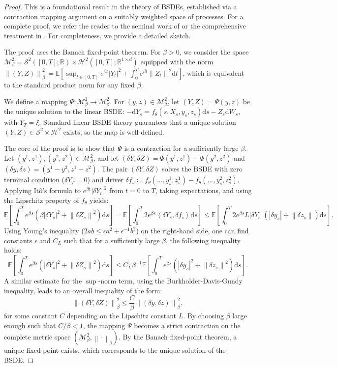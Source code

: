 \documentclass[qian]{imsart}
\newcommand{\R}{\mathbb{R}}
\newcommand{\E}{\mathbb{E}}
\newcommand{\dd}{\mathrm{d}}
\newcommand{\norm}[1]{\left\lVert#1\right\rVert}
\newcommand{\abs}[1]{\left\lvert#1\right\rvert}
\newcommand{\scpr}[2]{\left\langle #1, #2 \right\rangle}
\theoremstyle{plain}
\theoremstyle{definition}
\begin{document}
\begin{proof}
This is a foundational result in the theory of BSDEs, established via a contraction mapping argument on a suitably weighted space of processes. For a complete proof, we refer the reader to the seminal work of \cite{PardouxPeng1990} or the comprehensive treatment in \cite{ElKarouiPengQuenez1997}. For completeness, we provide a detailed sketch.

The proof uses the Banach fixed-point theorem. For $\beta > 0$, we consider the space $\mathcal{M}^2_\beta = \mathcal{S}^2([0,T]; \R) \times \mathcal{H}^2([0,T]; \R^{1 \times d})$ equipped with the norm $\norm{(Y,Z)}^2_{\beta} \coloneqq \E\left[\sup_{t \in [0,T]} e^{\beta t} \abs{Y_t}^2 + \int_0^T e^{\beta t} \norm{Z_t}^2 \dd t\right]$, which is equivalent to the standard product norm for any fixed $\beta$.

We define a mapping $\Psi: \mathcal{M}^2_\beta \to \mathcal{M}^2_\beta$. For $(y,z) \in \mathcal{M}^2_\beta$, let $(Y, Z) = \Psi(y,z)$ be the unique solution to the linear BSDE: $- \dd Y_s = f_\theta(s, X_s, y_s, z_s) \dd s - Z_s \dd W_s$, with $Y_T = \xi$. Standard linear BSDE theory guarantees that a unique solution $(Y,Z) \in \mathcal{S}^2 \times \mathcal{H}^2$ exists, so the map is well-defined.

The core of the proof is to show that $\Psi$ is a contraction for a sufficiently large $\beta$. Let $(y^1, z^1), (y^2, z^2) \in \mathcal{M}^2_\beta$, and let $(\delta Y, \delta Z) = \Psi(y^1, z^1) - \Psi(y^2, z^2)$ and $(\delta y, \delta z) = (y^1-y^2, z^1-z^2)$. The pair $(\delta Y, \delta Z)$ solves the BSDE with zero terminal condition ($\delta Y_T=0$) and driver $\delta f_s \coloneqq f_\theta(\dots,y^1_s,z^1_s) - f_\theta(\dots,y^2_s,z^2_s)$. Applying Itô's formula to $e^{\beta t}\abs{\delta Y_t}^2$ from $t=0$ to $T$, taking expectations, and using the Lipschitz property of $f_\theta$ yields:
\[
\E\left[ \int_0^T e^{\beta s} \left(\beta \abs{\delta Y_s}^2 + \norm{\delta Z_s}^2\right) \dd s \right] = \E\left[ \int_0^T 2e^{\beta s} \scpr{\delta Y_s}{\delta f_s} \dd s \right] \le \E\left[\int_0^T 2e^{\beta s} L \abs{\delta Y_s}(\abs{\delta y_s} + \norm{\delta z_s}) \dd s \right].
\]
Using Young's inequality ($2ab \le \epsilon a^2 + \epsilon^{-1} b^2$) on the right-hand side, one can find constants $\epsilon$ and $C_L$ such that for a sufficiently large $\beta$, the following inequality holds:
\[
\E\left[ \int_0^T e^{\beta s} \left( \abs{\delta Y_s}^2 + \norm{\delta Z_s}^2 \right) \dd s \right] \le C_L \beta^{-1} \E\left[ \int_0^T e^{\beta s} \left( \abs{\delta y_s}^2 + \norm{\delta z_s}^2 \right) \dd s \right].
\]
A similar estimate for the $\sup$-norm term, using the Burkholder-Davis-Gundy inequality, leads to an overall inequality of the form:
\[
\norm{(\delta Y, \delta Z)}^2_{\beta} \le \frac{C}{\beta} \norm{(\delta y, \delta z)}^2_{\beta},
\]
for some constant $C$ depending on the Lipschitz constant $L$. By choosing $\beta$ large enough such that $C/\beta < 1$, the mapping $\Psi$ becomes a strict contraction on the complete metric space $(\mathcal{M}^2_\beta, \norm{\cdot}_\beta)$. By the Banach fixed-point theorem, a unique fixed point exists, which corresponds to the unique solution of the BSDE.
\end{proof}
\end{document}
